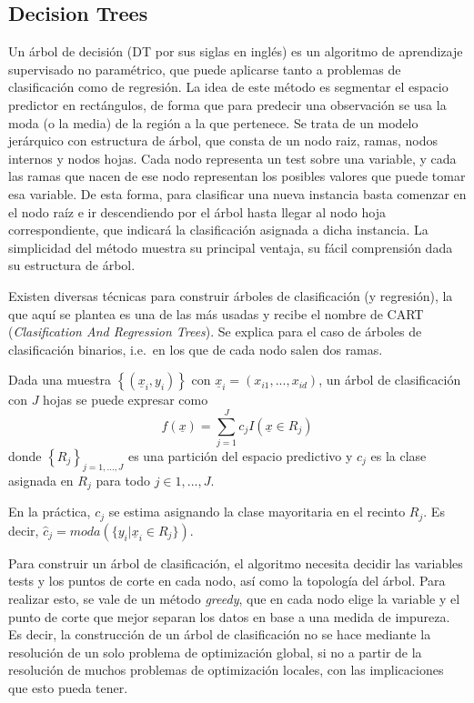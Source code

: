\documentclass[12pt,a4paper,]{book}
\numberwithin{dummy}{section}
\theoremstyle{ocrenumbox}
\theoremstyle{blacknumex}
\theoremstyle{blacknumbox}
\theoremstyle{ocrenum}
\theoremstyle{ocrenum}
\begin{document}
\hypertarget{decision-trees}{%
\subsection{Decision Trees}\label{decision-trees}}

Un árbol de decisión (DT por sus siglas en inglés) es un algoritmo de
aprendizaje supervisado no paramétrico, que puede aplicarse tanto a
problemas de clasificación como de regresión. La idea de este método es
segmentar el espacio predictor en rectángulos, de forma que para
predecir una observación se usa la moda (o la media) de la región a la
que pertenece. Se trata de un modelo jerárquico con estructura de árbol,
que consta de un nodo raiz, ramas, nodos internos y nodos hojas. Cada
nodo representa un test sobre una variable, y cada las ramas que nacen
de ese nodo representan los posibles valores que puede tomar esa
variable. De esta forma, para clasificar una nueva instancia basta
comenzar en el nodo raíz e ir descendiendo por el árbol hasta llegar al
nodo hoja correspondiente, que indicará la clasificación asignada a
dicha instancia. La simplicidad del método muestra su principal ventaja,
su fácil comprensión dada su estructura de árbol.

Existen diversas técnicas para construir árboles de clasificación (y
regresión), la que aquí se plantea es una de las más usadas y recibe el
nombre de CART (\emph{Clasification And Regression Trees}). Se explica
para el caso de árboles de clasificación binarios, i.e.~en los que de
cada nodo salen dos ramas.

Dada una muestra \(\left\{ (\underline x_i,y_i) \right\}\) con
\(\underline x_i = (x_{i1},...,x_{id})\), un árbol de clasificación con
\(J\) hojas se puede expresar como
\[f(\underline x) = \sum_{j=1}^J c_j I(\underline x \in R_j)\] donde
\(\left\{ R_j\right\}_{j=1,...,J}\) es una partición del espacio
predictivo y \(c_j\) es la clase asignada en \(R_j\) para todo
\(j \in {1,...,J}\).

En la práctica, \(c_j\) se estima asignando la clase mayoritaria en el
recinto \(R_j\). Es decir,
\(\hat c_j = moda(\{y_i | \underline x_i \in R_j\})\).

Para construir un árbol de clasificación, el algoritmo necesita decidir
las variables tests y los puntos de corte en cada nodo, así como la
topología del árbol. Para realizar esto, se vale de un método
\emph{greedy}, que en cada nodo elige la variable y el punto de corte
que mejor separan los datos en base a una medida de impureza. Es decir,
la construcción de un árbol de clasificación no se hace mediante la
resolución de un solo problema de optimización global, si no a partir de
la resolución de muchos problemas de optimización locales, con las
implicaciones que esto pueda tener.
\end{document}
